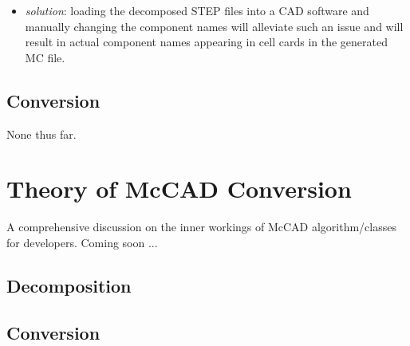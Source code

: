 \documentclass[12pt, a4paper, titlepage]{article}
\begin{document}
\begin{itemize}
\begin{itemize}
    	\item \emph{solution}: loading the decomposed STEP files into a CAD software and manually changing the component names will alleviate such an issue and will result in actual component names appearing in cell cards in the generated MC file.  
    \end{itemize} 
\end{itemize}
\subsection{Conversion}
None thus far.


\section{Theory of McCAD Conversion} \label{sec:Theory of McCAD Conversion}
A comprehensive discussion on the inner workings of McCAD algorithm/classes for developers. Coming soon ...
\subsection{Decomposition}
\subsection{Conversion}
\newpage
%

\end{document}
